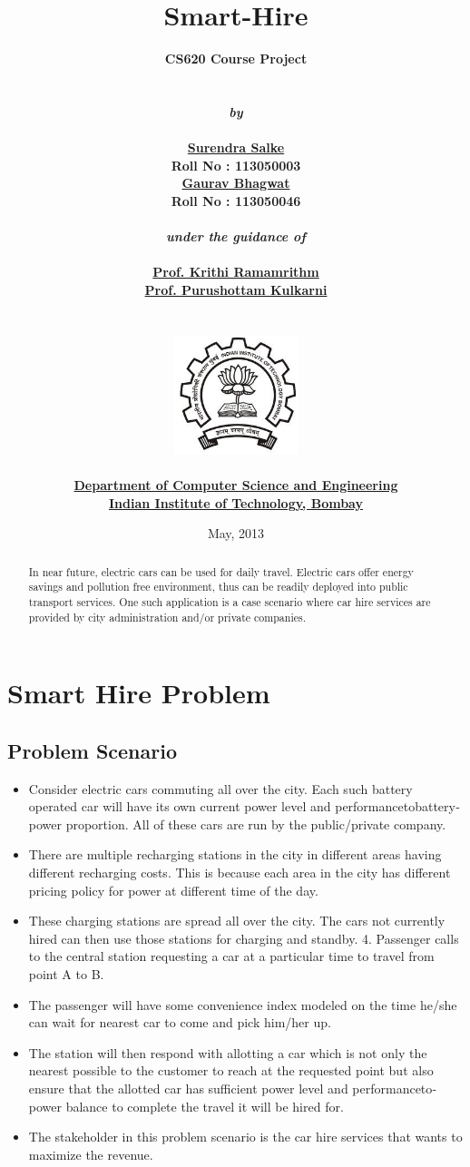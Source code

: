 \documentclass[11pt]{report}
\title{\textbf{Smart-Hire}}
\author{\bf{CS620 Course Project}\\
        \\
        \\
        \emph{by}\\
        \\
        \href{http://www.cse.iitb.ac.in/~surendra/}{\bf{Surendra Salke}}\\
        \bf{Roll No : 113050003}\\
	\href{http://http://www.cse.iitb.ac.in/~bhagwatgaurav/}{\bf{Gaurav Bhagwat}}\\
        \bf{Roll No : 113050046}\\
        \\
        \emph{under the guidance of}\\
        \\
        \href{http://www.cse.iitb.ac.in/~krithi/}{\bf{Prof. Krithi Ramamrithm}}\\
	\href{http://www.cse.iitb.ac.in/~puru/}{\bf{Prof. Purushottam Kulkarni}}\\
        \\\\
        \includegraphics[height=3.5cm]{../plots/iitb_logo}\\
        \\
        \href{http://www.cse.iitb.ac.in/}{\bf{Department of Computer Science and Engineering}}\\
        \href{http://www.iitb.ac.in/}{\bf{Indian Institute of Technology, Bombay}}\\
}
\date{May, 2013}
\begin{document}
\maketitle

\tableofcontents
\listoffigures

\begin{abstract}
In near future, electric cars can be used for daily travel. Electric cars offer energy savings and
 pollution free environment, thus can be readily deployed into public transport services. One such 
application is a case scenario where car hire services are provided by city administration and/or private 
companies.


\end{abstract}


\chapter{Smart Hire Problem}

\section{Problem Scenario}
\begin{itemize}
\item Consider electric cars commuting all over the city. Each such battery operated car will have
its own current power level and performance­to­battery­power proportion. All of these cars are
run by the public/private company.
\item There are multiple recharging stations in the city in different areas having different recharging
costs. This is because each area in the city has different pricing policy for power at different time
of the day.
\item These charging stations are spread all over the city. The cars not currently hired can then use
those stations for charging and standby.
4. Passenger calls to the central station requesting a car at a particular time to travel from point
A to B.
\item The passenger will have some convenience index modeled on the time he/she can wait for
nearest car to come and pick him/her up.
\item The station will then respond with allotting a car which is not only the nearest possible to the
customer to reach at the requested point but also ensure that the allotted car has sufficient
power level and performance­to­power balance to complete the travel it will be hired for.
\item The stakeholder in this problem scenario is the car hire services that wants to maximize the revenue.
\end{itemize}
\end{document}
